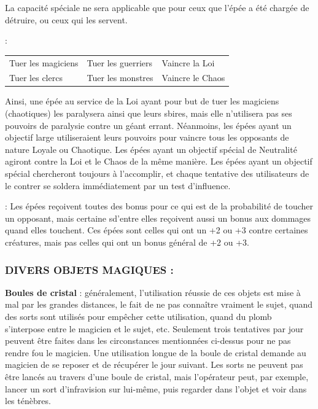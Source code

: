 \documentclass[11pt]{article}
\newcommand{\myunderline}[1]{\underline{\smash{#1}}}
\begin{document}
{{\bigskip

La capacité spéciale ne sera applicable que pour ceux que l'épée a été chargée de détruire, ou ceux qui les servent.

\myunderline{\textbf{Objectifs}}:

\medskip

{\parindent1.5cm\begin{tabular}{p{4.6cm}p{4.6cm}p{4.6cm}}
Tuer les magiciens & Tuer les guerriers & Vaincre la Loi \\
Tuer les clercs & Tuer les monstres & Vaincre le Chaos \\
\end{tabular}}

\bigskip

Ainsi, une épée au service de la Loi ayant pour but de tuer les magiciens (chaotiques) les paralysera ainsi que leurs sbires, mais elle n'utilisera pas ses pouvoirs de paralysie contre un géant errant. Néanmoins, les épées ayant un objectif large utiliseraient leurs pouvoirs pour vaincre tous les opposants de nature Loyale ou Chaotique. Les épées ayant un objectif spécial de Neutralité agiront contre la Loi et le Chaos de la même manière. Les épées ayant un objectif spécial chercheront toujours à l'accomplir, et chaque tentative des utilisateurs de le contrer se soldera immédiatement par un test d'influence.

\bigskip

\myunderline{\textbf{EPEES, BONUS AUX DOMMAGES}} : Les épées reçoivent toutes des bonus pour ce qui est de la probabilité de toucher un opposant, mais certaine sd'entre elles reçoivent aussi un bonus aux dommages quand elles touchent. Ces épées sont celles qui ont un +2 ou +3 contre certaines créatures, mais pas celles qui ont un bonus général de +2 ou +3.



\subsubsection*{DIVERS OBJETS MAGIQUES :}

\label{boulecristal}\textbf{Boules de cristal} : généralement, l'utilisation réussie de ces objets est mise à mal par les grandes distances, le fait de ne pas connaître vraiment le sujet, quand des sorts sont utilisés pour empêcher cette utilisation, quand du plomb s'interpose entre le magicien et le sujet, etc. Seulement trois tentatives par jour peuvent être faites dans les circonstances mentionnées ci-dessus pour ne pas rendre fou le magicien. Une utilisation longue de la boule de cristal demande au magicien de se reposer et de récupérer le jour suivant. Les sorts ne peuvent pas être lancés au travers d'une boule de cristal, mais l'opérateur peut, par exemple, lancer un sort d'infravision sur lui-même, puis regarder dans l'objet et voir dans les ténèbres.

}}
\end{document}
